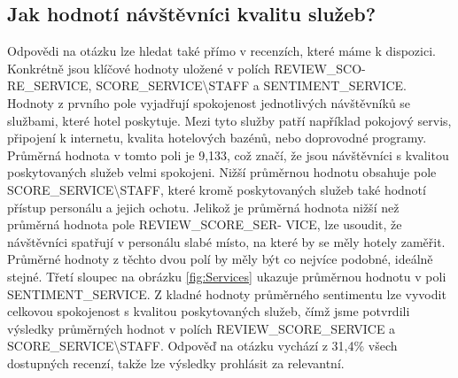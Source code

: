 \documentclass[czech,BP]{thesiskiv}
\begin{document}
\subsection{Jak hodnotí návštěvníci kvalitu služeb?}
Odpovědi na otázku lze hledat také přímo v recenzích, které máme k dispozici. Konkrétně jsou klíčové hodnoty uložené v polích REVIEW\_SCO- RE\_SERVICE, SCORE\_SERVICE\textbackslash STAFF a SENTIMENT\_SERVICE.\\ Hodnoty z prvního pole vyjadřují spokojenost jednotlivých návštěvníků se službami, které hotel poskytuje. Mezi tyto služby patří například pokojový servis, připojení k internetu, kvalita hotelových bazénů, nebo doprovodné programy. Průměrná hodnota v tomto poli je 9,133, což značí, že jsou návštěvníci s kvalitou poskytovaných služeb velmi spokojeni. Nižší průměrnou hodnotu obsahuje pole SCORE\_SERVICE\textbackslash STAFF, které kromě poskytovaných služeb také hodnotí přístup personálu a jejich ochotu. Jelikož je průměrná hodnota nižší než průměrná hodnota pole REVIEW\_SCORE\_SER- VICE, lze usoudit, že návštěvníci spatřují v personálu slabé místo, na které by se měly hotely zaměřit. Průměrné hodnoty z těchto dvou polí by měly být co nejvíce podobné, ideálně stejné. Třetí sloupec na obrázku \ref{fig:Services} ukazuje průměrnou hodnotu v poli SENTIMENT\_SERVICE. Z kladné hodnoty průměrného sentimentu lze vyvodit celkovou spokojenost s kvalitou poskytovaných služeb, čímž jsme potvrdili výsledky průměrných hodnot v polích REVIEW\_SCORE\_SERVICE a SCORE\_SERVICE\textbackslash STAFF. Odpověď na otázku vychází z 31,4\% všech dostupných recenzí, takže lze výsledky prohlásit za relevantní.
% 
\end{document}
